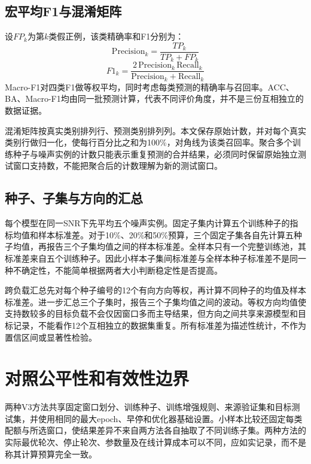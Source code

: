 \documentclass[UTF8,12pt,openany,twoside]{ctexbook}
\numberwithin{equation}{chapter}
\begin{document}
\subsection{宏平均F1与混淆矩阵}\label{ux5b8fux5e73ux5747f1ux4e0eux6df7ux6dc6ux77e9ux9635}

设$FP_k$为第$k$类假正例，该类精确率和F1分别为：
\begin{equation}
\label{eq:auto19}
\mathrm{Precision}_k=\frac{TP_k}{TP_k+FP_k}
\end{equation}
\begin{equation}
\label{eq:auto20}
F1_k=\frac{2\,\mathrm{Precision}_k\,\mathrm{Recall}_k}{\mathrm{Precision}_k+\mathrm{Recall}_k}
\end{equation}
Macro-F1对四类F1做等权平均，同时考虑每类预测的精确率与召回率。ACC、BA、Macro-F1均由同一批预测计算，代表不同评价角度，并不是三份互相独立的数据证据。

混淆矩阵按真实类别排列行、预测类别排列列。本文保存原始计数，并对每个真实类别行做归一化，使每行百分比之和为100\%，对角线为该类召回率。聚合多个训练种子与噪声实例的计数只能表示重复预测的合并结果，必须同时保留原始独立测试窗口支持数，不能把聚合后的计数理解为新的测试窗口。

\subsection{种子、子集与方向的汇总}\label{ux79cdux5b50ux5b50ux96c6ux4e0eux65b9ux5411ux7684ux6c47ux603b}

每个模型在同一SNR下先平均五个噪声实例。固定子集内计算五个训练种子的指标均值和样本标准差。对于10\%、20\%和50\%预算，三个固定子集各自先计算五种子均值，再报告三个子集均值之间的样本标准差。全样本只有一个完整训练池，其标准差来自五个训练种子。因此小样本子集间标准差与全样本种子标准差不是同一种不确定性，不能简单根据两者大小判断稳定性是否提高。

跨负载汇总先对每个种子编号的12个有向方向等权，再计算不同种子的均值及样本标准差。进一步汇总三个子集时，报告三个子集均值之间的波动。等权方向均值使支持数较多的目标负载不会仅因窗口多而主导结果，但方向之间共享来源模型和目标记录，不能看作12个互相独立的数据集重复。所有标准差为描述性统计，不作为置信区间或显著性检验。

\section{对照公平性和有效性边界}\label{ux5bf9ux7167ux516cux5e73ux6027ux548cux6709ux6548ux6027ux8fb9ux754c}

两种V3方法共享固定窗口划分、训练种子、训练增强规则、来源验证集和目标测试集，并使用相同的最大epoch、早停和优化器基础设置。小样本比较还固定每类配额与所选窗口，使结果差异不来自两方法各自抽取了不同训练子集。两种方法的实际最优轮次、停止轮次、参数量及在线计算成本可以不同，应如实记录，而不是称其计算预算完全一致。
\end{document}
